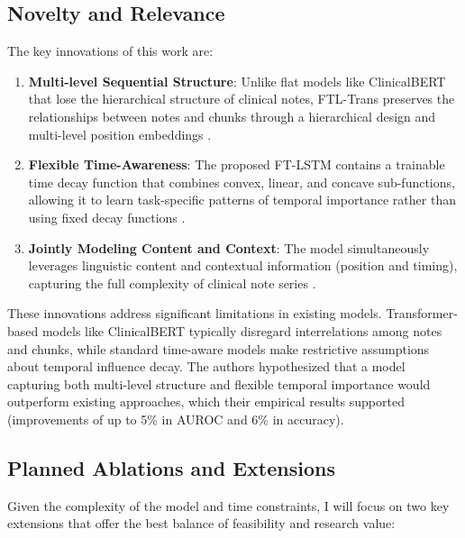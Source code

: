 \documentclass[10pt,letterpaper,twocolumn]{article}
\begin{document}
\subsection{Novelty and Relevance}

The key innovations of this work are:

\begin{enumerate}[leftmargin=*]
    \item \textbf{Multi-level Sequential Structure}: Unlike flat models like ClinicalBERT \cite{huang2019clinicalbert} that lose the hierarchical structure of clinical notes, FTL-Trans preserves the relationships between notes and chunks through a hierarchical design and multi-level position embeddings \cite{zhang2020time}.
    
    \item \textbf{Flexible Time-Awareness}: The proposed FT-LSTM contains a trainable time decay function that combines convex, linear, and concave sub-functions, allowing it to learn task-specific patterns of temporal importance rather than using fixed decay functions \cite{baytas2017patient}.
    
    \item \textbf{Jointly Modeling Content and Context}: The model simultaneously leverages linguistic content and contextual information (position and timing), capturing the full complexity of clinical note series \cite{zhang2020time}.
\end{enumerate}

These innovations address significant limitations in existing models. Transformer-based models like ClinicalBERT \cite{huang2019clinicalbert} typically disregard interrelations among notes and chunks, while standard time-aware models \cite{baytas2017patient} make restrictive assumptions about temporal influence decay. The authors hypothesized that a model capturing both multi-level structure and flexible temporal importance would outperform existing approaches, which their empirical results supported (improvements of up to 5\% in AUROC and 6\% in accuracy).

\subsection{Planned Ablations and Extensions}

Given the complexity of the model and time constraints, I will focus on two key extensions that offer the best balance of feasibility and research value:
\end{document}
